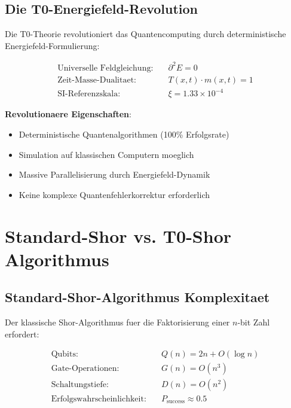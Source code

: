 \documentclass[12pt,a4paper]{article}
\newcommand{\Efield}{E}
\newcommand{\xipar}{\xi}
\newcommand{\Tfield}{T}
\newcommand{\mfield}{m}
\begin{document}
	\subsection{Die T0-Energiefeld-Revolution}
	
	Die T0-Theorie revolutioniert das Quantencomputing durch deterministische Energiefeld-Formulierung:
	
	\begin{align}
		\text{Universelle Feldgleichung}: \quad &\partial^2 \Efield = 0 \\
		\text{Zeit-Masse-Dualitaet}: \quad &\Tfield(x,t) \cdot \mfield(x,t) = 1 \\
		\text{SI-Referenzskala}: \quad &\xipar = 1.33 \times 10^{-4}
	\end{align}
	
	\textbf{Revolutionaere Eigenschaften}:
	\begin{itemize}
		\item Deterministische Quantenalgorithmen (100\% Erfolgsrate)
		\item Simulation auf klassischen Computern moeglich
		\item Massive Parallelisierung durch Energiefeld-Dynamik
		\item Keine komplexe Quantenfehlerkorrektur erforderlich
	\end{itemize}
	
	\section{Standard-Shor vs. T0-Shor Algorithmus}
	
	\subsection{Standard-Shor-Algorithmus Komplexitaet}
	
	Der klassische Shor-Algorithmus fuer die Faktorisierung einer $n$-bit Zahl erfordert:
	
	\begin{align}
		\text{Qubits}: \quad &Q(n) = 2n + O(\log n) \\
		\text{Gate-Operationen}: \quad &G(n) = O(n^3) \\
		\text{Schaltungstiefe}: \quad &D(n) = O(n^2) \\
		\text{Erfolgswahrscheinlichkeit}: \quad &P_{\text{success}} \approx 0.5
	\end{align}
	
\end{document}
